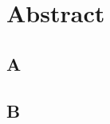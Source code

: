 \documentclass[../relazione.tex]{subfiles}
\begin{document}
\section{Abstract}
	\subsection{A}
	\subsection{B}
\end{document}

